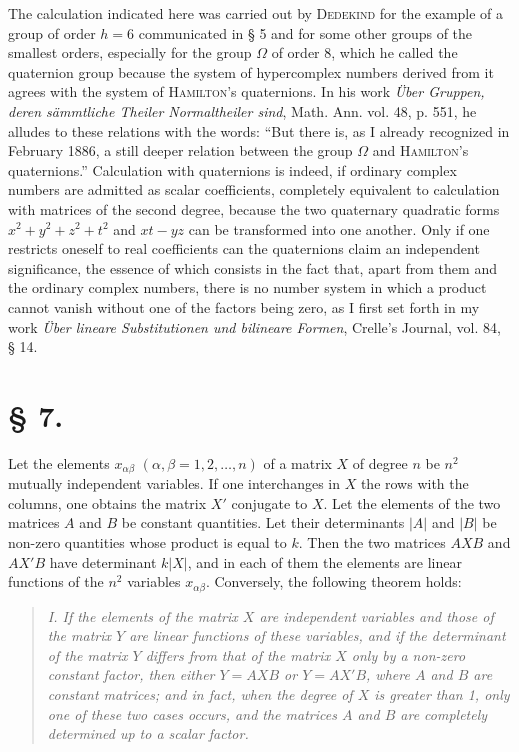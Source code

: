 \documentclass[11pt]{article}
\begin{document}
The calculation indicated here was carried out by \textsc{Dedekind} for the example of a group of order $h=6$ communicated in § 5 and for some other groups of the smallest orders, especially for the group $\Omega$ of order 8, which he called the quaternion group because the system of hypercomplex numbers derived from it agrees with the system of \textsc{Hamilton}'s quaternions. In his work \emph{Über Gruppen, deren sämmtliche Theiler Normaltheiler sind}, Math. Ann. vol. 48, p. 551, he alludes to these relations with the words: ``But there is, as I already recognized in February 1886, a still deeper relation between the group $\Omega$ and \textsc{Hamilton}'s quaternions.'' Calculation with quaternions is indeed, if ordinary complex numbers are admitted as scalar coefficients, completely equivalent to calculation with matrices of the second degree, because the two quaternary quadratic forms $x^2+y^2+z^2+t^2$ and $xt-yz$ can be transformed into one another. Only if one restricts oneself to real coefficients can the quaternions claim an independent significance, the essence of which consists in the fact that, apart from them and the ordinary complex numbers, there is no number system in which a product cannot vanish without one of the factors being zero, as I first set forth in my work \emph{Über lineare Substitutionen und bilineare Formen}, Crelle's Journal, vol. 84, § 14.

\section*{§ 7.}

Let the elements $x_{\alpha\beta}$ $(\alpha,\beta=1,2,\ldots,n)$ of a matrix $X$ of degree $n$ be $n^2$ mutually independent variables. If one interchanges in $X$ the rows with the columns, one obtains the matrix $X'$ conjugate to $X$. Let the elements of the two matrices $A$ and $B$ be constant quantities. Let their determinants $|A|$ and $|B|$ be non-zero quantities whose product is equal to $k$. Then the two matrices $AXB$ and $AX'B$ have determinant $k|X|$, and in each of them the elements are linear functions of the $n^2$ variables $x_{\alpha\beta}$. Conversely, the following theorem holds:

\begin{quote}\itshape
I. If the elements of the matrix $X$ are independent variables and those of the matrix $Y$ are linear functions of these variables, and if the determinant of the matrix $Y$ differs from that of the matrix $X$ only by a non-zero constant factor, then either $Y=AXB$ or $Y=AX'B$, where $A$ and $B$ are constant matrices; and in fact, when the degree of $X$ is greater than 1, only one of these two cases occurs, and the matrices $A$ and $B$ are completely determined up to a scalar factor.
\end{quote}
\end{document}
